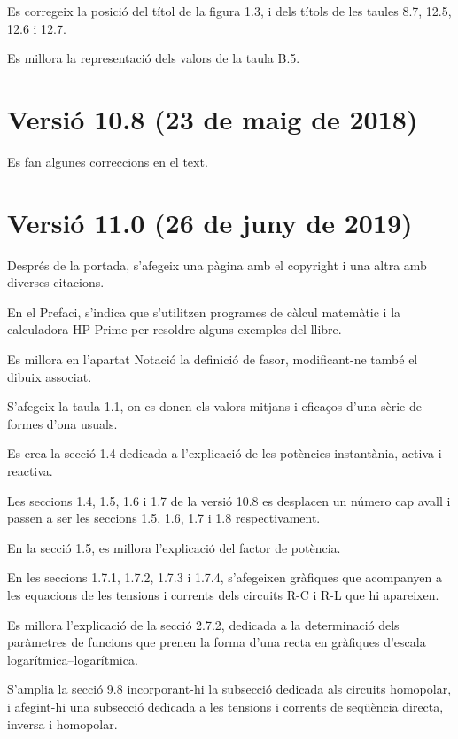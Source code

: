 Es corregeix la posició del títol de la figura 1.3, i dels títols de les taules 8.7, 12.5, 12.6 i 12.7.

Es millora la representació dels valors de la taula B.5.

\section*{Versió 10.8 (23 de maig de 2018)}

Es fan algunes correccions en el text.


\section*{Versió 11.0 (26 de juny de 2019)}

Després de la portada, s'afegeix una pàgina amb el copyright i una altra amb diverses citacions.

En el Prefaci, s'indica que s’utilitzen programes de càlcul matemàtic i la calculadora \textsf{HP Prime}
per resoldre alguns  exemples del llibre.

Es millora en l'apartat Notació la definició de  fasor, modificant-ne també el dibuix associat.

S'afegeix la taula 1.1, on es donen els valors mitjans i eficaços d'una sèrie de formes d'ona usuals.

Es crea la secció 1.4 dedicada a l'explicació de  les potències instantània, activa i reactiva.

Les seccions 1.4, 1.5, 1.6 i 1.7 de la versió 10.8 es desplacen un número cap
avall i passen a ser les seccions 1.5, 1.6, 1.7 i 1.8 respectivament.

En la secció 1.5, es millora l'explicació del factor de potència.

En les seccions 1.7.1, 1.7.2, 1.7.3 i 1.7.4, s'afegeixen gràfiques que acompanyen a les equacions de les tensions i corrents  dels circuits R-C i R-L que hi apareixen.

Es millora l'explicació de  la secció 2.7.2, dedicada
a la determinació dels paràmetres de funcions que prenen la forma d’una recta en gràfiques d’escala
logarítmica–logarítmica.

S'amplia la secció 9.8 incorporant-hi la subsecció dedicada als circuits homopolar, i afegint-hi una subsecció dedicada a les tensions i corrents de seqüència directa, inversa i homopolar.

